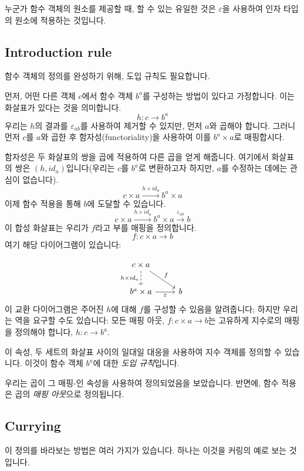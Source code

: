 \documentclass[DaoFP]{subfiles}
\begin{document}
누군가 함수 객체의 원소를 제공할 때, 할 수 있는 유일한 것은 $\varepsilon$을 사용하여 인자 타입의 원소에 적용하는 것입니다.

\subsection{Introduction rule}
함수 객체의 정의를 완성하기 위해, 도입 규칙도 필요합니다.

먼저, 어떤 다른 객체 $c$에서 함수 객체 $b^a$를 구성하는 방법이 있다고 가정합니다. 이는 화살표가 있다는 것을 의미합니다.
\[h \colon c \to b^a\]
우리는 $h$의 결과를 $\varepsilon_{a b}$를 사용하여 제거할 수 있지만, 먼저 $a$와 곱해야 합니다. 그러니 먼저 $c$를 $a$와 곱한 후 함자성(functoriality)을 사용하여 이를 $b^a \times a$로 매핑합시다.

함자성은 두 화살표의 쌍을 곱에 적용하여 다른 곱을 얻게 해줍니다. 여기에서 화살표의 쌍은 $(h, id_a)$입니다(우리는 $c$를 $b^a$로 변환하고자 하지만, $a$를 수정하는 데에는 관심이 없습니다).
\[ c \times a \xrightarrow{h \times id_a} b^a \times a \]
이제 함수 적용을 통해 $b$에 도달할 수 있습니다.
\[ c \times a \xrightarrow{h \times id_a} b^a \times a \xrightarrow{\varepsilon_{a b}} b\]
이 합성 화살표는 우리가 $f$라고 부를 매핑을 정의합니다.
\[f \colon c \times a \to b\]
여기 해당 다이어그램이 있습니다:

\[
 \begin{tikzcd}
 c \times a
 \arrow[d, dashed, "h \times id_a"']
 \arrow[rd, "f"]
 \\
 b^a \times a
 \arrow[r, "\varepsilon"']
& b
 \end{tikzcd}
\]
이 교환 다이어그램은 주어진 $h$에 대해 $f$를 구성할 수 있음을 알려줍니다; 하지만 우리는 역을 요구할 수도 있습니다: 모든 매핑 아웃, $f \colon c \times a \to b$는 고유하게 지수로의 매핑을 정의해야 합니다, $h \colon c \to b^a$.

이 속성, 두 세트의 화살표 사이의 일대일 대응을 사용하여 지수 객체를 정의할 수 있습니다. 이것이 함수 객체 $b^a$에 대한 \emph{도입 규칙}입니다.

우리는 곱이 그 매핑-인 속성을 사용하여 정의되었음을 보았습니다. 반면에, 함수 적용은 곱의 \emph{매핑 아웃}으로 정의됩니다.

\subsection{Currying}

이 정의를 바라보는 방법은 여러 가지가 있습니다. 하나는 이것을 커링의 예로 보는 것입니다.
\end{document}
